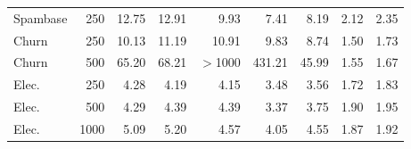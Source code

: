 \begin{tabular}{lrrrrrrrr}
Spambase & 250 & 12.75 & 12.91 & 9.93 & 7.41 & 8.19 & 2.12 & 2.35 \\
Churn & 250 & 10.13 & 11.19 & 10.91 & 9.83 & 8.74 & 1.50 & 1.73 \\
Churn & 500 & 65.20 & 68.21 & $>$1000 & 431.21 & 45.99 & 1.55 & 1.67 \\
Elec. & 250 & 4.28 & 4.19 & 4.15 & 3.48 & 3.56 & 1.72 & 1.83 \\
Elec. & 500 & 4.29 & 4.39 & 4.39 & 3.37 & 3.75 & 1.90 & 1.95 \\
Elec. & 1000 & 5.09 & 5.20 & 4.57 & 4.05 & 4.55 & 1.87 & 1.92 \\
\bottomrule
\end{tabular}
